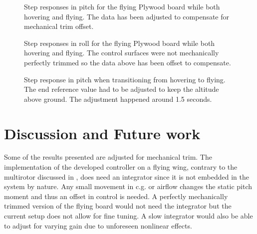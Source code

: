 \documentclass{article}
\begin{document}
\begin{figure}[]
    \centering
    
    \caption{Step responses in pitch for the flying Plywood board while both hovering and flying. The data has been adjusted to compensate for mechanical trim offset.}
    \label{fig:pitchstep}
\end{figure}

\begin{figure}[]
    
    \caption{Step responses in roll for the flying Plywood board while both hovering and flying. The control surfaces were not mechanically perfectly trimmed so the data above has been offset to compensate.}
    \label{fig:rollstep}
\end{figure}

\begin{figure}[]
    
    \caption{Step response in pitch when transitioning from hovering to flying. The end reference value had to be adjusted to keep the altitude above ground. The adjustment happened around 1.5 seconds.}
    \label{fig:transition}
\end{figure}



\section{Discussion and Future work}

Some of the results presented are adjusted for mechanical trim.
The implementation of the developed controller on a flying wing, contrary to the multirotor discussed in \cite{P2}, does need an integrator since it is not embedded in the system by nature.
Any small movement in c.g. or airflow changes the static pitch moment and thus an offset in control is needed.
A perfectly mechanically trimmed version of the flying board would not need the integrator but the current setup does not allow for fine tuning.
A slow integrator would also be able to adjust for varying gain due to unforeseen nonlinear effects.
\end{document}
